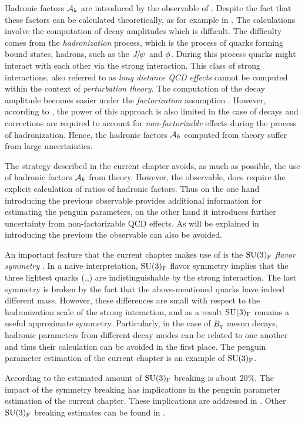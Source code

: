 Hadronic factors $\mathcal{A}_{k}$ are introduced by the  observable of .
Despite the fact that these factors can be calculated theoretically, as for example
in \cite{DeBruyn-thesis}. The calculations involve the computation of \BJpsiX decay amplitudes
which is difficult. The difficulty comes from the {\it hadronization} process, which is the
process of quarks forming bound states, hadrons, such as the ${J\mskip -3mu/\mskip -2mu\psi\mskip 2mu}$ and $\phi$.
During this process quarks might interact with each other via the strong interaction.
This class of strong interactions, also referred to as {\it long distance QCD effects}
cannot be computed within the context of {\it perturbation theory}.
The computation of the \BJpsiX decay amplitude becomes easier under the
{\it factorization} assumption \cite{HAAN1970448,Wirbel1985,CABIBBO1978418,FAKIROV1978315}.
However, according to \cite{DeBruyn:2014oga},
the power of this approach is also limited in the case of \BJpsiX decays and corrections
are required to account for {\it non-factorizable} effects during the process of hadronization.
Hence, the hadronic factors $\mathcal{A}_{k}$ computed from theory suffer from large uncertainties.

The strategy described in the current chapter avoids, as much as possible, the use of hadronic
factors $\mathcal{A}_{k}$ from theory. However, the  observable, does require the explicit
calculation of ratios of hadronic factors. Thus on the one hand
introducing the previous observable provides additional information for estimating the penguin
parameters, on the other hand it introduces further uncertainty from non-factorizable QCD effects.
As will be explained in  introducing the previous the 
observable can also be avoided.

An important feature that the current chapter makes use of is the
$\mathrm{SU}(3)_{\rm F}$ {\it flavor symmetry} \cite{GELLMANN1964214,NEEMAN1961222}.
In a naive interpretation, $\mathrm{SU}(3)_{\rm F}$ flavor symmetry implies that the three lightest quarks (\uquark,\dquark,\squark)
are indistinguishable by the strong interaction. The last symmetry is broken by the fact that the above-mentioned
quarks have indeed different mass. However, these differences are small with respect
to the hadronization scale \lqcd of the strong interaction, and as a result $\mathrm{SU}(3)_{\rm F}$
remains a useful approximate symmetry. Particularly, in the case of $B_q$ meson decays, hadronic
parameters from different decay modes can be related to one another and thus their calculation can be avoided
in the first place. The penguin parameter estimation of the current chapter is an example of $\mathrm{SU}(3)_{\rm F}$.

According to \cite{Nagashima:2007qn,Gronau:2013mda} the estimated amount of $\mathrm{SU}(3)_{\rm F}$ breaking is about $20\%$.
The impact of the symmetry breaking has implications in the penguin parameter estimation
of the current chapter. These implications are addressed in .
Other $\mathrm{SU}(3)_{\rm F}$ breaking estimates can be found in \cite{Charles:2015gya,PDG}.
